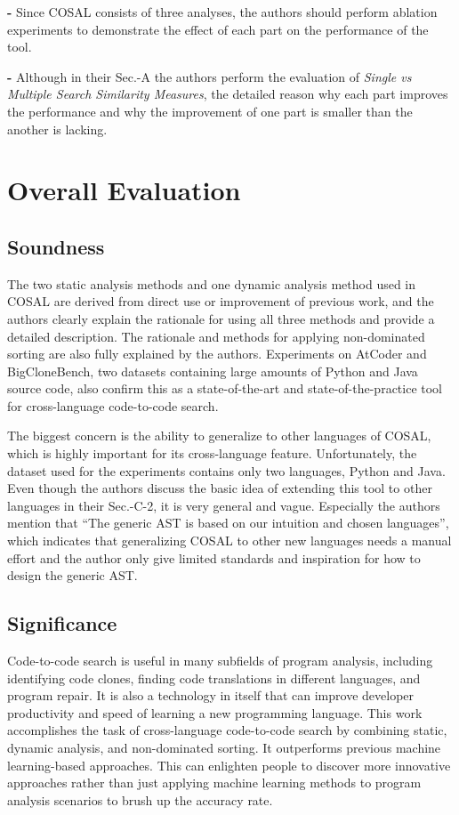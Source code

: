 \documentclass[conference]{IEEEtran}
\newcommand{\RNum}[1]{\uppercase\expandafter{\romannumeral #1\relax}}
\begin{document}
\textbf{-} Since COSAL consists of three analyses, the authors should perform ablation experiments to demonstrate the effect of each part on the performance of the tool.

\textbf{-} Although in their Sec.\RNum{6}-A the authors perform the evaluation of \textit{Single vs Multiple Search Similarity Measures}, the detailed reason why each part improves the performance and why the improvement of one part is smaller than the another is lacking.


\section{Overall Evaluation}
\subsection{Soundness}
The two static analysis methods and one dynamic analysis method used in COSAL are derived from direct use or improvement of previous work, and the authors clearly explain the rationale for using all three methods and provide a detailed description. The rationale and methods for applying non-dominated sorting are also fully explained by the authors. Experiments on AtCoder and BigCloneBench, two datasets containing large amounts of Python and Java source code, also confirm this as a state-of-the-art and state-of-the-practice tool for cross-language code-to-code search.

The biggest concern is the ability to generalize to other languages of COSAL, which is highly important for its cross-language feature. Unfortunately, the dataset used for the experiments contains only two languages, Python and Java. Even though the authors discuss the basic idea of extending this tool to other languages in their Sec.\RNum{7}-C-2, it is very general and vague. Especially the authors mention that “The generic AST is based on our intuition and chosen languages”, which indicates that generalizing COSAL to other new languages needs a manual effort and the author only give limited standards and inspiration for how to design the generic AST.

\subsection{Significance}
Code-to-code search is useful in many subfields of program analysis, including identifying code clones, finding code translations in different languages, and program repair. It is also a technology in itself that can improve developer productivity and speed of learning a new programming language. This work accomplishes the task of cross-language code-to-code search by combining static, dynamic analysis, and non-dominated sorting. It outperforms previous machine learning-based approaches. This can enlighten people to discover more innovative approaches rather than just applying machine learning methods to program analysis scenarios to brush up the accuracy rate.
\end{document}
